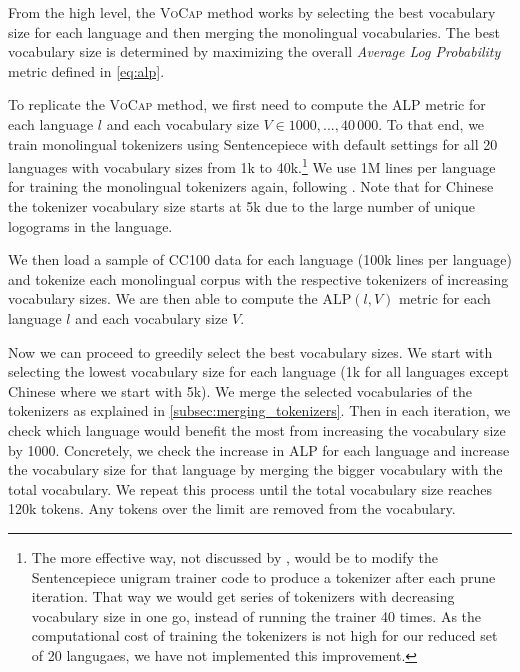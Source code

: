 
From the high level, the \textsc{VoCap} method works by selecting the best vocabulary size for each language and then merging the monolingual vocabularies. The best vocabulary size is determined by maximizing the overall \textit{Average Log Probability} metric defined in \autoref{eq:alp}. 

To replicate the \textsc{VoCap} method, we first need to compute the \textsc{ALP} metric for each language $l$ and each vocabulary size $V \in {1000, ..., 40\,000}$. To that end, we train monolingual tokenizers using Sentencepiece with default settings for all 20 languages with vocabulary sizes from 1k to 40k.\footnote{The more effective way, not discussed by \citet{zheng_allocating_2021}, would be to modify the Sentencepiece unigram trainer code to produce a tokenizer after each prune iteration. That way we would get series of tokenizers with decreasing vocabulary size in one go, instead of running the trainer 40 times. As the computational cost of training the tokenizers is not high for our reduced set of 20 langugaes, we have not implemented this improvement.} We use 1M lines per language for training the monolingual tokenizers again, following \citet{zheng_allocating_2021}. Note that for Chinese the tokenizer vocabulary size starts at 5k due to the large number of unique logograms in the language. 


We then load a sample of CC100 data for each language (100k lines per language) and tokenize each monolingual corpus with the respective tokenizers of increasing vocabulary sizes. We are then able to compute the $\mathrm{ALP}(l, V)$ metric for each language $l$ and each vocabulary size $V$.

Now we can proceed to greedily select the best vocabulary sizes. We start with selecting the lowest vocabulary size for each language (1k for all languages except Chinese where we start with 5k). We merge the selected vocabularies of the tokenizers as explained in \autoref{subsec:merging_tokenizers}. Then in each iteration, we check which language would benefit the most from increasing the vocabulary size by 1000. Concretely, we check the increase in ALP for each language and increase the vocabulary size for that language by merging the bigger vocabulary with the total vocabulary. We repeat this process until the total vocabulary size reaches 120k tokens. Any tokens over the limit are removed from the vocabulary.

